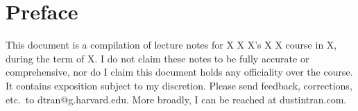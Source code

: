 \documentclass{lecture}
\date{X}
\begin{document}
\frontmatter
\maketitle
\begingroup
\let\cleardoublepage\clearpage
\tableofcontents

\chapter*{Preface}
This document is a compilation of lecture notes for X X X's X X course in X,
during the term of X.  I do not claim these notes to be fully accurate or
comprehensive, nor do I claim this document holds any officiality over
the course. It contains exposition subject to my discretion. Please send
feedback, corrections, etc.\ to {dtran@g.harvard.edu}.  More broadly, I can be
reached at {dustintran.com}.

\mainmatter
\endgroup

%


\end{document}
